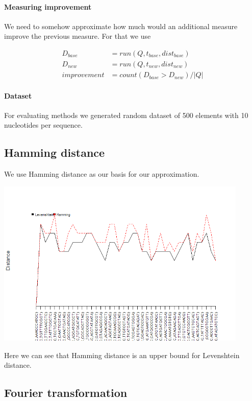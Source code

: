\documentclass [12pt, a4]{article} %
\begin{document}
\paragraph{Measuring improvement}

We need to somehow approximate how much would an additional measure improve the previous measure. For that we use

\begin{align*}
D_{base} &= run(Q, t_{base}, dist_{base}) \\
D_{new} &= run(Q, t_{new}, dist_{new}) \\
improvement &= count(D_{base} > D_{new} ) / |Q|
\end{align*}

\paragraph{Dataset}

For evaluating methods we generated random dataset of 500 elements with 10 nucleotides per sequence.

\subsection{Hamming distance}

We use Hamming distance as our basis for our approximation.

\includegraphics[width=0.9\textwidth]{img/hamming.png}

Here we can see that Hamming distance is an upper bound for Levenshtein distance.

\subsection{Fourier transformation}
\end{document}
